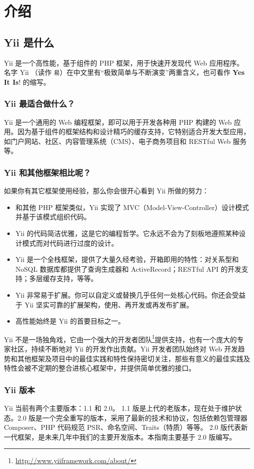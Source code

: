 \chapter{介绍}
\label{intro-yii.md}\section{Yii 是什么}
Yii 是一个高性能，基于组件的 PHP 框架，用于快速开发现代 Web 应用程序。名字 Yii （读作 \lstinline|易|）在中文里有“极致简单与不断演变”两重含义，也可看作 \textbf{Yes It Is}! 的缩写。

\subsection{Yii 最适合做什么？}
Yii 是一个通用的 Web 编程框架，即可以用于开发各种用 PHP 构建的 Web 应用。因为基于组件的框架结构和设计精巧的缓存支持，它特别适合开发大型应用，如门户网站、社区、内容管理系统（CMS）、电子商务项目和 RESTful Web 服务等。

\subsection{Yii 和其他框架相比呢？}
如果你有其它框架使用经验，那么你会很开心看到 Yii 所做的努力：

\begin{itemize}
\item 和其他 PHP 框架类似，Yii 实现了 MVC（Model-View-Controller）设计模式并基于该模式组织代码。
\item Yii 的代码简洁优雅，这是它的编程哲学。它永远不会为了刻板地遵照某种设计模式而对代码进行过度的设计。
\item Yii 是一个全栈框架，提供了大量久经考验，开箱即用的特性：对关系型和 NoSQL 数据库都提供了查询生成器和 
ActiveRecord；RESTful API 的开发支持；多层缓存支持，等等。
\item Yii 非常易于扩展。你可以自定义或替换几乎任何一处核心代码。你还会受益于 Yii 
坚实可靠的扩展架构，使用、再开发或再发布扩展。
\item 高性能始终是 Yii 的首要目标之一。
\end{itemize}
Yii 不是一场独角戏，它由一个强大的开发者团队\footnote{\url{http://www.yiiframework.com/about/}}提供支持，也有一个庞大的专家社区，持续不断地对 Yii 的开发作出贡献。Yii 开发者团队始终对 Web 开发趋势和其他框架及项目中的最佳实践和特性保持密切关注，那些有意义的最佳实践及特性会被不定期的整合进核心框架中，并提供简单优雅的接口。

\subsection{Yii 版本}
Yii 当前有两个主要版本：1.1 和 2.0。 1.1 版是上代的老版本，现在处于维护状态。2.0 版是一个完全重写的版本，采用了最新的技术和协议，包括依赖包管理器 Composer、PHP 代码规范 PSR、命名空间、Traits（特质）等等。 2.0 版代表新一代框架，是未来几年中我们的主要开发版本。本指南主要基于 2.0 版编写。

